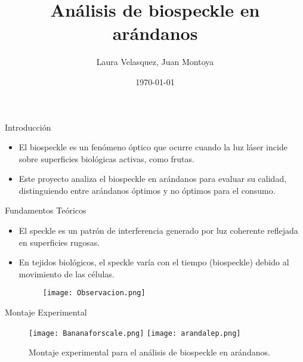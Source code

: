 \documentclass{beamer}
\title{Análisis de biospeckle en arándanos}
\author{Laura Velasquez, Juan Montoya}
\institute{FCEN@UdeA}
\date{\today}
\begin{document}
\begin{frame}
    \titlepage
\end{frame}

\begin{frame}{Introducción}
    \begin{itemize}
        \item El biospeckle es un fenómeno óptico que ocurre cuando la luz láser incide sobre superficies biológicas activas, como frutas.
        \item Este proyecto analiza el biospeckle en arándanos para evaluar su calidad, distinguiendo entre arándanos óptimos y no óptimos para el consumo.
    \end{itemize}
\end{frame}


\begin{frame}{Fundamentos Teóricos}
    \begin{itemize}
        \item El speckle es un patrón de interferencia generado por luz coherente reflejada en superficies rugosas.
        \item En tejidos biológicos, el speckle varía con el tiempo (biospeckle) debido al movimiento de las células.
        \\[0.5cm]
        \begin{figure}
            \texttt{[image: Observacion.png]}
        \end{figure}
    \end{itemize}
\end{frame}

\begin{frame}{Montaje Experimental}
    \begin{figure}
        \texttt{[image: Bananaforscale.png]}
        \texttt{[image: arandalep.png]}
        \caption{Montaje experimental para el análisis de biospeckle en arándanos.}
    \end{figure}
\end{frame}
\end{document}
